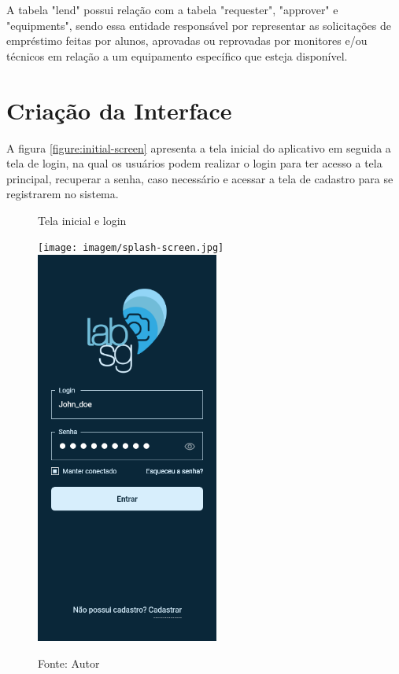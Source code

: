     A tabela "lend" possui relação com a tabela "requester", "approver" e "equipments", sendo essa entidade responsável por representar as solicitações de empréstimo feitas por alunos, aprovadas ou reprovadas por monitores e/ou técnicos em relação a um equipamento específico que esteja disponível.
    
    \section{Criação da Interface}
    
    A figura \ref{figure:initial-screen} apresenta a tela inicial do aplicativo em seguida a tela de login, na qual os usuários podem realizar o login para ter acesso a tela principal, recuperar a senha, caso necessário e acessar a tela de cadastro para se registrarem no sistema.
    
    \begin{figure}[tb]
    \begin{center}
    \caption{Tela inicial e login}
    \texttt{[image: imagem/splash-screen.jpg]}
    \label{figure:initial-screen}
    \quad
    \includegraphics[width=6cm]{imagem/Sign in-1.png}
    \caption*{Fonte: Autor}
    \label{figure:sign-in-screen}
    \end{center}
    \end{figure}
    
